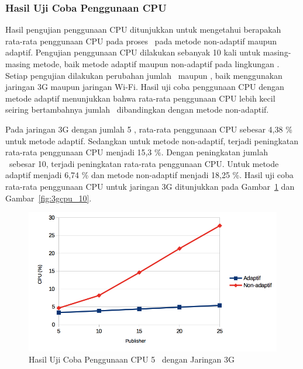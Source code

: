 
\subsubsection{Hasil Uji Coba Penggunaan CPU}

Hasil pengujian penggunaan CPU ditunjukkan untuk mengetahui berapakah rata-rata
penggunaan CPU pada proses \tracking~pada metode non-adaptif maupun adaptif.
Pengujian penggunaan CPU dilakukan sebanyak 10 kali untuk masing-masing metode,
baik metode adaptif maupun non-adaptif pada lingkungan \testbed.  Setiap
pengujian dilakukan perubahan jumlah \publisher~maupun \subscriber, baik
menggunakan jaringan 3G maupun jaringan Wi-Fi. Hasil uji coba penggunaan CPU
dengan metode adaptif menunjukkan bahwa rata-rata penggunaan CPU lebih kecil
seiring bertambahnya jumlah \publisher~dibandingkan dengan metode non-adaptif.

Pada jaringan 3G dengan jumlah 5 \subscriber, rata-rata penggunaan CPU sebesar
4,38 \% untuk metode adaptif. Sedangkan untuk metode non-adaptif, terjadi
peningkatan rata-rata penggunaan CPU menjadi 15,3 \%. Dengan peningkatan jumlah
\subscriber~sebesar 10, terjadi peningkatan rata-rata penggunaan CPU. Untuk
metode adaptif menjadi 6,74 \% dan metode non-adaptif menjadi 18,25 \%. Hasil
uji coba rata-rata penggunaan CPU untuk jaringan 3G ditunjukkan pada
Gambar~\ref{fig:3gcpu_5} dan Gambar~\ref{fig:3gcpu_10}.

\noindent
\begin{figure}
  \centering
  \includegraphics[scale=0.90]
	{images/4-3gcpu5.png}
	\caption{Hasil Uji Coba Penggunaan CPU 5 \Subscriber~dengan Jaringan 3G}
	\label{fig:3gcpu_5}
\end{figure}
\noindent

